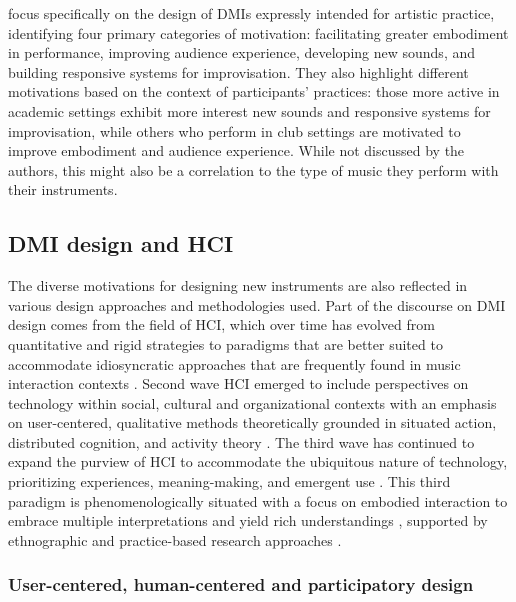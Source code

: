 \documentclass[letterpaper, 12pt]{article}
\begin{document}
\citet{Emerson2018} focus specifically on the design of DMIs expressly intended for artistic practice, identifying four primary categories of motivation: facilitating greater embodiment in performance, improving audience experience, developing new sounds, and building responsive systems for improvisation. They also highlight different motivations based on the context of participants' practices: those more active in academic settings exhibit more interest new sounds and responsive systems for improvisation, while others who perform in club settings are motivated to improve embodiment and audience experience. While not discussed by the authors, this might also be a correlation to the type of music they perform with their instruments. 

\subsection{DMI design and HCI}
\label{sec:dmi-design-and-hci}

The diverse motivations for designing new instruments are also reflected in various design approaches and methodologies used. Part of the discourse on DMI design comes from the field of HCI, which over time has evolved from quantitative and rigid strategies \citep{Bodker2015} to paradigms that are better suited to accommodate idiosyncratic approaches that are frequently found in music interaction contexts \citep{Wanderley2002}. Second wave HCI emerged to include perspectives on technology within social, cultural and organizational contexts \citep{kaptelinin2003} with an emphasis on user-centered, qualitative methods theoretically grounded in situated action, distributed cognition, and activity theory \citep{Bodker2006}. The third wave has continued to expand the purview of HCI to accommodate the ubiquitous nature of technology, prioritizing experiences, meaning-making, and emergent use \citep{Bodker2015}. This third paradigm is phenomenologically situated with a focus on embodied interaction to embrace multiple interpretations and yield rich understandings \citep{Harrison2007}, supported by ethnographic and practice-based research approaches \citep{Bodker2015}.

\subsubsection{User-centered, human-centered and participatory design}
\label{sec:user-centered-design}
\end{document}
